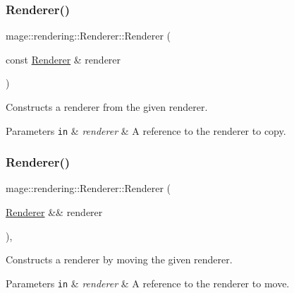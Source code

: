 \subsubsection{\texorpdfstring{Renderer()}{Renderer()}\hspace{0.1cm}{\footnotesize\ttfamily [2/3]}}
{\footnotesize\ttfamily mage\+::rendering\+::\+Renderer\+::\+Renderer (\begin{DoxyParamCaption}\item[{const \mbox{\hyperlink{classmage_1_1rendering_1_1_renderer}{Renderer}} \&}]{renderer }\end{DoxyParamCaption})\hspace{0.3cm}{\ttfamily [delete]}}

Constructs a renderer from the given renderer.


\begin{DoxyParams}[1]{Parameters}
\mbox{\tt in}  & {\em renderer} & A reference to the renderer to copy. \\
\hline
\end{DoxyParams}
\mbox{\label{classmage_1_1rendering_1_1_renderer_aab7768b815e740173a20e10795a6f93e}} 
\subsubsection{\texorpdfstring{Renderer()}{Renderer()}\hspace{0.1cm}{\footnotesize\ttfamily [3/3]}}
{\footnotesize\ttfamily mage\+::rendering\+::\+Renderer\+::\+Renderer (\begin{DoxyParamCaption}\item[{\mbox{\hyperlink{classmage_1_1rendering_1_1_renderer}{Renderer}} \&\&}]{renderer }\end{DoxyParamCaption})\hspace{0.3cm}{\ttfamily [default]}, {\ttfamily [noexcept]}}

Constructs a renderer by moving the given renderer.


\begin{DoxyParams}[1]{Parameters}
\mbox{\tt in}  & {\em renderer} & A reference to the renderer to move. \\
\hline
\end{DoxyParams}
\mbox{\label{classmage_1_1rendering_1_1_renderer_ab5c0553ac8a095f55eab371b843b354b}} 
